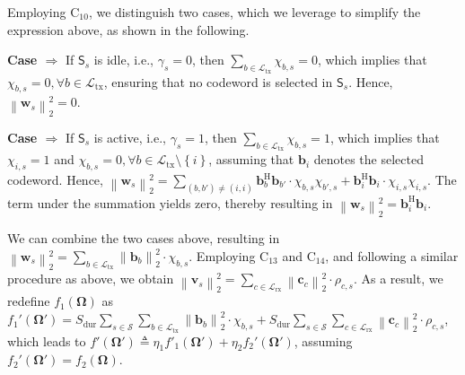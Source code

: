 \documentclass[10pt,journal,compsoc]{IEEEtran}
\newcommand*\circled[1]{\tikz[baseline=(char.base)]{
            \node[shape=circle,draw,inner sep=2pt] (char) {#1};}}
\theoremstyle{myremark}
\theoremstyle{myexample}
\begin{document}
\begin{appendices}
Employing $ \mathrm{C}_{10} $, we distinguish two cases, which we leverage to simplify the expression above, as shown in the following.  
	
 	
	
\noindent \textbf{Case \circled{\footnotesize{1}} $\Rightarrow$ } If $ \mathsf{S}_s $ is idle, i.e., $ \gamma_s = 0 $, then $ \sum_{b \in \mathcal{L}_\mathrm{tx}} \chi_{b,s} = 0 $, which implies that $ \chi_{b,s} = 0, \forall b \in \mathcal{L}_\mathrm{tx} $, ensuring that no codeword is selected in $ \mathsf{S}_s $. Hence, $ \left\| \mathbf{w}_s \right\|_2^2 = 0 $.
	
\noindent \textbf{Case \circled{\footnotesize{2}} $\Rightarrow$ } If $ \mathsf{S}_s $ is active, i.e., $ \gamma_s = 1 $, then $ \sum_{b \in \mathcal{L}_\mathrm{tx}} \chi_{b,s} = 1 $, which implies that $ \chi_{i,s} = 1 $ and  $ \chi_{b,s} = 0, \forall b \in \mathcal{L}_\mathrm{tx} \setminus \left\lbrace i \right\rbrace $, assuming that $ \mathbf{b}_i $ denotes the selected codeword. Hence, $ \left\| \mathbf{w}_s \right\|_2^2 =  \sum_{(b,b') \neq (i,i)} \mathbf{b}_b^\mathrm{H} \mathbf{b}_{b'} \cdot \chi_{b,s} \chi_{b',s} +  \mathbf{b}_i^\mathrm{H} \mathbf{b}_{i} \cdot \chi_{i,s} \chi_{i,s} $. The term under the summation yields zero, thereby resulting in $ \left\| \mathbf{w}_s \right\|_2^2 = \mathbf{b}_i^\mathrm{H} \mathbf{b}_{i} $.

We can combine the two cases above, resulting in $ \left\| \mathbf{w}_s \right\|_2^2 =  \sum_{b \in \mathcal{L}_\mathrm{tx}} \left\| \mathbf{b}_b \right\|_2^2 \cdot \chi_{b,s} $. Employing $ \mathrm{C}_{13} $ and $ \mathrm{C}_{14} $, and following a similar procedure as above, we obtain $ \left\| \mathbf{v}_s \right\|_2^2 = \sum_{c \in \mathcal{L}_\mathrm{rx}} \left\| \mathbf{c}_c \right\|_2^2 \cdot \rho_{c,s} $.	As a result, we redefine  $ f_1 \left( \boldsymbol{\Omega} \right) $ as $ f_1' \left( \boldsymbol{\Omega}' \right) = S_\mathrm{dur} \sum_{s \in \mathcal{S}} \sum_{b \in \mathcal{L}_\mathrm{tx}} \left\| \mathbf{b}_b \right\|_2^2 \cdot \chi_{b,s} + S_\mathrm{dur} \sum_{s \in \mathcal{S}} \sum_{c \in \mathcal{L}_\mathrm{rx}} \left\| \mathbf{c}_c \right\|_2^2 \cdot \rho_{c,s} $, which leads to $ f' \left( \boldsymbol{\Omega}' \right) \triangleq \eta_1  f'_1 \left( \boldsymbol{\Omega}' \right) + \eta_2 f_2' \left( \boldsymbol{\Omega}' \right) $, assuming $ f_2' \left( \boldsymbol{\Omega}' \right) = f_2 \left( \boldsymbol{\Omega} \right) $. 

 


\setcounter{equation}{0}
\setcounter{table}{0}
\renewcommand{\theequation}{O.\arabic{equation}}

\end{appendices}
\end{document}
